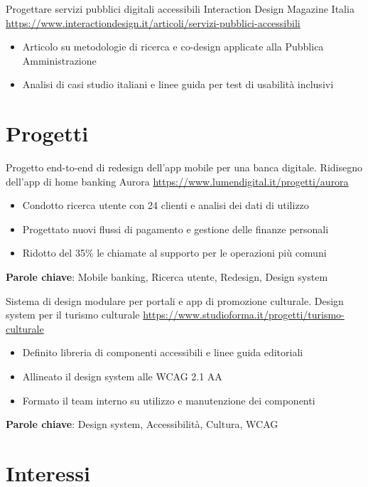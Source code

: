 \documentclass[a4paper, serif, 10pt]{moderncv}
\begin{document}
        {Progettare servizi pubblici digitali accessibili}
        {Interaction Design Magazine Italia}
        {\url{https://www.interactiondesign.it/articoli/servizi-pubblici-accessibili}}
        {}
        {\begin{itemize}
\item Articolo su metodologie di ricerca e co-design applicate alla Pubblica Amministrazione
\item Analisi di casi studio italiani e linee guida per test di usabilità inclusivi
\end{itemize}}
\section{Progetti}

        {Progetto end-to-end di redesign dell'app mobile per una banca digitale.}
        {Ridisegno dell'app di home banking Aurora}
        {\url{https://www.lumendigital.it/progetti/aurora}}
        {}
        {\begin{itemize}
\item Condotto ricerca utente con 24 clienti e analisi dei dati di utilizzo
\item Progettato nuovi flussi di pagamento e gestione delle finanze personali
\item Ridotto del 35\% le chiamate al supporto per le operazioni più comuni
\end{itemize}
\textbf{Parole chiave}: Mobile banking, Ricerca utente, Redesign, Design system}

        {Sistema di design modulare per portali e app di promozione culturale.}
        {Design system per il turismo culturale}
        {\url{https://www.studioforma.it/progetti/turismo-culturale}}
        {}
        {\begin{itemize}
\item Definito libreria di componenti accessibili e linee guida editoriali
\item Allineato il design system alle WCAG 2.1 AA
\item Formato il team interno su utilizzo e manutenzione dei componenti
\end{itemize}
\textbf{Parole chiave}: Design system, Accessibilità, Cultura, WCAG}
\section{Interessi}
\end{document}
